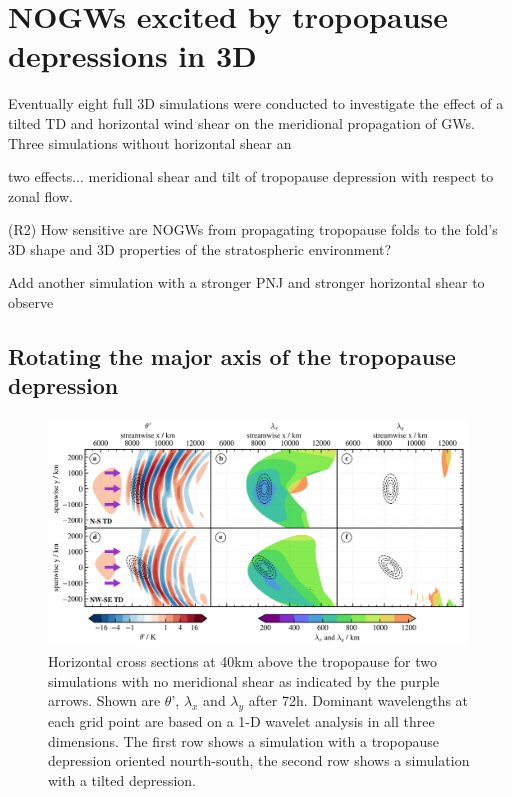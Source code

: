 \chapter{NOGWs excited by tropopause depressions in 3D}
\label{sec:results3D}

Eventually eight full 3D simulations were conducted to investigate the effect of a tilted TD and horizontal wind shear on the meridional propagation of GWs.
Three simulations without horizontal shear an

two effects... meridional shear and tilt of tropopause depression with respect to zonal flow.

\begin{tcolorbox}[]
    (R2) How sensitive are NOGWs from propagating tropopause folds to the fold's 3D shape and 3D properties of the stratospheric environment?
\end{tcolorbox}

Add another simulation with a stronger PNJ and stronger horizontal shear to observe 

\section{Rotating the major axis of the tropopause depression}
\begin{figure}[tbp]
    \centering
    \includegraphics[width=0.99\textwidth]{figures_3D/waveletAna_overview_noShear.png}
    \caption{Horizontal cross sections at 40km above the tropopause for two simulations with no meridional shear as indicated by the purple arrows. Shown are $\theta$', $\lambda_x$ and $\lambda_y$ after 72h. Dominant wavelengths at each grid point are based on a 1-D wavelet analysis in all three dimensions. The first row shows a simulation with a tropopause depression oriented nourth-south, the second row shows a simulation with a tilted depression.}
    \label{fig:waveletAna_noShear}
\end{figure}



